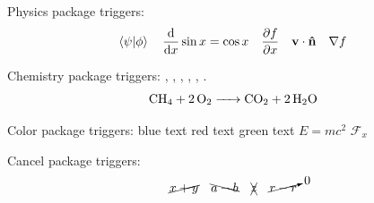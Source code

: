 \begin{preview}
Physics package triggers:
\[
  \ip{\psi}{\phi}\quad \dv{x}\sin x=\cos x\quad
  \pdv{f}{x}\quad \vb{v}\cdot\vu{n}\quad \nabla f
\]

Chemistry package triggers:
, , , , ,
.
\[
  \ce{CH4 + 2O2 -> CO2 + 2H2O}
\]

Color package triggers:
{\color{blue}blue text} {\color{red}red text} {\color{green!50!black}green text}
{\color{blue}$E=mc^2$} {\color{red}$\mathcal{F}_{x}$}

Cancel package triggers:
\[
  \cancel{x+y}\quad \bcancel{a-b}\quad \xcancel{z}\quad \cancelto{0}{r-r}
\]

\end{preview}

